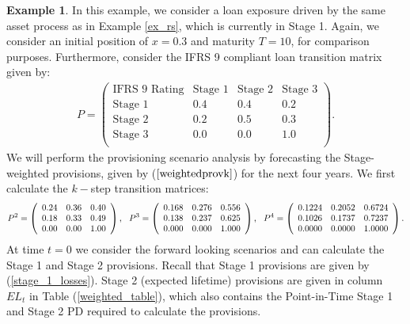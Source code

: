 \documentclass[11pt,reqno]{article}
\theoremstyle{definition}
\newtheorem{example}[theorem]{Example}
\begin{document}
 \begin{example}
 In this example, we consider a loan exposure driven by the same asset process as in Example \ref{ex_rs}, which is currently in Stage 1. Again, we consider an initial position of $x=0.3$ and maturity $T=10$, for comparison purposes. Furthermore, consider the IFRS 9 compliant loan transition matrix given by:
 \begin{eqnarray}\label{transmatrix}
 P=\left(  \begin{array}{c|ccc}
 \text{IFRS 9 Rating} & \text{Stage 1} & \text{Stage 2}  & \text{Stage 3}\\
 \hline
 \text{Stage 1} & 0.4 & 0.4 & 0.2\\
 \text{Stage 2} & 0.2 & 0.5 & 0.3 \\
  \text{Stage 3} & 0.0& 0.0 & 1.0 \\
 \end{array}
 \right).
  \end{eqnarray}
We will perform the provisioning scenario analysis by forecasting the Stage-weighted provisions, given by ($\ref{weightedprovk}$) for the next four years. We first calculate the $k-$step transition matrices:
  	\begin{eqnarray} \notag
  P^2=\left( \begin{array}{ccc}
  0.24 & 0.36 & 0.40 \\
 0.18 & 0.33 & 0.49 \\
  0.00 & 0.00 & 1.00\\
  \end{array}
  \right),
  \,\,\,\,
 P^3=\left( \begin{array}{ccc}
  0.168 & 0.276 &0.556 \\
  0.138 & 0.237 & 0.625\\
  0.000 & 0.000 & 1.000\\
  \end{array}
  \right),
  \,\,\,\,
  P^4=\left( \begin{array}{ccc}
  0.1224 & 0.2052 & 0.6724 \\
  0.1026 & 0.1737 & 0.7237 \\
  0.0000 & 0.0000 & 1.0000\\
  \end{array}
  \right).
\end{eqnarray}
At time $t=0$ we consider the forward looking scenarios and can calculate the Stage 1 and Stage 2 provisions. Recall that Stage 1 provisions are given by (\ref{stage_1_losses}). Stage 2 (expected lifetime) provisions are given in column $EL_t$ in Table (\ref{weighted_table}), which also contains the Point-in-Time Stage 1 and Stage 2 PD required to calculate the provisions. 

\end{example}
\end{document}
